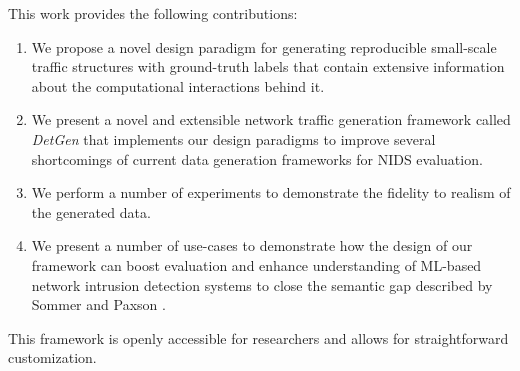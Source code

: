\documentclass[sigconf]{acmart}
\begin{document}

 
This work provides the following contributions:

\begin{enumerate}
\item We propose a novel design paradigm for generating reproducible small-scale traffic structures with ground-truth labels that contain extensive information about the computational interactions behind it. 
\item We present a novel and extensible network traffic generation framework called \textit{DetGen} that implements our design paradigms to improve several shortcomings of current data generation frameworks for NIDS evaluation.
\item We perform a number of experiments to demonstrate the fidelity to realism of the generated data.
\item We present a number of use-cases to demonstrate how the design of our framework can boost evaluation and enhance understanding of ML-based network intrusion detection systems to close the semantic gap described by Sommer and Paxson \cite{sommer2010outside}.
\end{enumerate}

This framework is openly accessible for researchers and allows for straightforward customization.

\end{document}
